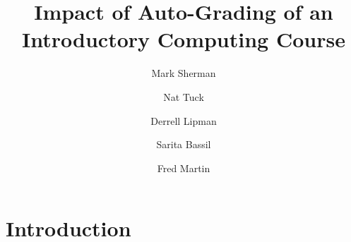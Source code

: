\documentclass[11pt]{amsart}
\title{Impact of Auto-Grading of an Introductory Computing Course}
\author{Mark Sherman \and Nat Tuck \and Derrell Lipman \and Sarita Bassil \and Fred Martin}
\begin{document}
\maketitle

\section{Introduction}


\end{document}
